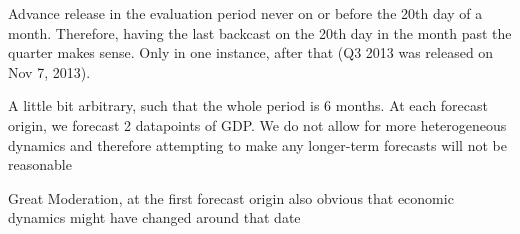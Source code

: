 Advance release in the evaluation period never on or before the 20th day of a month. Therefore, having the last backcast on the 20th day in the month past the quarter makes sense. Only in one instance, after that (Q3 2013 was released on Nov 7, 2013). 

A little bit arbitrary, such that the whole period is 6 months. At each forecast origin, we forecast 2 datapoints of GDP. We do not allow for more heterogeneous dynamics and therefore attempting to make any longer-term forecasts will not be reasonable

Great Moderation, at the first forecast origin also obvious that economic dynamics might have changed around that date 

% 

